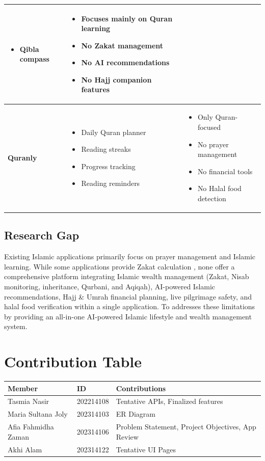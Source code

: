 \documentclass[12pt,a4paper]{article}
\begin{document}
\begin{longtable}{|L{2.6cm}|L{5.6cm}|L{5.6cm}|}
\begin{itemize}
\item Qibla compass
\end{itemize}
&
\begin{itemize}
\item Focuses mainly on Quran learning
\item No Zakat management
\item No AI recommendations
\item No Hajj companion features
\end{itemize}
\\ \hline
\textbf{Quranly} &
\begin{itemize}
\item Daily Quran planner
\item Reading streaks
\item Progress tracking
\item Reading reminders
\end{itemize}
&
\begin{itemize}
\item Only Quran-focused
\item No prayer management
\item No financial tools
\item No Halal food detection
\end{itemize}
\\ \hline
\end{longtable}

\subsection*{Research Gap}

Existing Islamic applications primarily focus on prayer management and Islamic learning. While some applications provide Zakat calculation , none offer a comprehensive platform integrating Islamic wealth management (Zakat, Nisab monitoring, inheritance, Qurbani, and Aqiqah), AI-powered Islamic recommendations, Hajj \& Umrah financial planning, live pilgrimage safety, and halal food verification within a single application. To addresses these limitations by providing an all-in-one AI-powered Islamic lifestyle and wealth management system.

\section{Contribution Table}

\begin{longtable}{|L{3.8cm}|C{2.6cm}|L{6.4cm}|}
\hline
{}
\textbf{Member} & \textbf{ID} & \textbf{Contributions} \\
\hline
\endfirsthead
\endfoot
\hline
\endlastfoot
Tasmia Nasir        & 202214108 & Tentative APIs, Finalized features \\ \hline
Maria Sultana Joly  & 202314103 & ER Diagram \\ \hline
Afia Fahmidha Zaman & 202314106 & Problem Statement, Project Objectives, App Review  \\ \hline
Akhi Alam           & 202314122 & Tentative UI Pages \\ \hline
\end{longtable}
\end{document}
